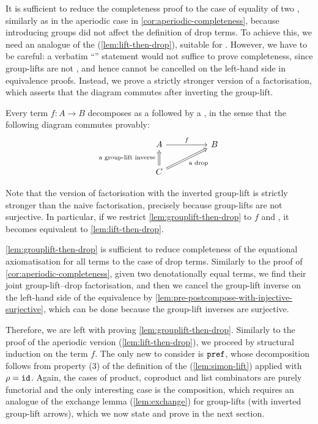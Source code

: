 It is sufficient to reduce the completeness proof to the case of equality of two , similarly as in the aperiodic case in \cref{cor:aperiodic-completeness}, because introducing groups did not affect the definition of drop terms. To achieve this, we need an analogue of the  (\cref{lem:lift-then-drop}), suitable for . However, we have to be careful: a verbatim ``'' statement would not suffice to prove completeness, since group-lifts are not , and hence cannot be cancelled on the left-hand side in equivalence proofs. Instead, we prove a strictly stronger version of a factorisation, which asserts that the diagram commutes after inverting the group-lift. 

\begin{lemma}\label{lem:grouplift-then-drop}
    Every term $f : A \to B$ decomposes as a  followed by a , in the sense that the following diagram commutes provably:
    \[ 
    \begin{tikzcd}[column sep=huge]
        A
        \ar[r, "f"]
        &B
        \\ 
        C 
        \ar[u, \dropar, "\text{a group-lift inverse}"{xshift=-0.5ex}]
        \ar[ur, \dropar, "\text{a drop}"']
    \end{tikzcd}
    \]
\end{lemma}

Note that the version of factorisation with the inverted group-lift is strictly stronger than the naive factorisation, precisely because group-lifts are not surjective. In particular, if we restrict \cref{lem:grouplift-then-drop} to  $f$ and , it becomes equivalent to \cref{lem:lift-then-drop}.

\cref{lem:grouplift-then-drop} is sufficient to reduce completeness of the equational axiomatisation for all terms to the case of drop terms. Similarly to the proof of \cref{cor:aperiodic-completeness}, given two denotationally equal terms, we find their joint group-lift--drop factorisation, and then we cancel the group-lift inverse on the left-hand side of the equivalence by \cref{lem:pre-postcompose-with-injective-surjective}, which can be done because the group-lift inverses are surjective.

Therefore, we are left with proving \cref{lem:grouplift-then-drop}. Similarly to the proof of the aperiodic version (\cref{lem:lift-then-drop}), we proceed by structural induction on the term $f$. The only new  to consider is $\mathtt{pref}$, whose decomposition follows from property (3) of the definition of the  (\cref{lem:simon-lift}) applied with $\rho = \mathtt{id}$. Again, the cases of product, coproduct and list combinators are purely functorial and the only interesting case is the composition, which requires an analogue of the exchange lemma (\cref{lem:exchange}) for group-lifts (with inverted group-lift arrows), which we now state and prove in the next section.

